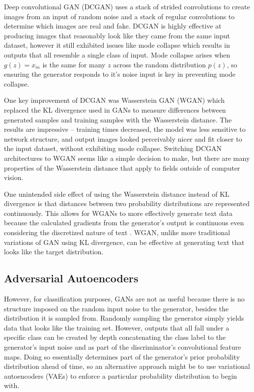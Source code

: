 \documentclass{article}
\begin{document}
		Deep convolutional GAN (DCGAN) \parencite{Radford2015} uses a stack of strided
		convolutions to create images from an input of random noise and a stack of
		regular convolutions to determine which images are real and fake. DCGAN is highly
		effective at producing images that reasonably look like they came from the same
		input dataset, however it still exhibited issues like mode collapse which results
		in outputs that all resemble a single class of input. Mode collapse arises when
		$g(z)=x_m$ is the same for many $z$ across the random distribution $p(z)$, so
		ensuring the generator responds to it's noise input is key in preventing mode collapse.

		One key improvement of DCGAN was Wasserstein GAN (WGAN) \parencite{Arjovsky2017}
		which replaced the KL divergence used in GANs to measure differences between generated
		samples and training samples with the Wasserstein distance. The results are impressive --
		training times decreased, the model was less sensitive to network structure, and output
		images looked perceivably nicer and fit closer to the input dataset, without exhibiting mode collapse.
		Switching DCGAN architectures to WGAN seems like a simple decision to make, but there
		are many properties of the Wasserstein distance that apply to fields outside of
		computer vision.

		One unintended side effect of using the Wasserstein distance instead of KL divergence is that distances
		between two probability distributions are represented continuously. This allows
		for WGANs to more effectively generate text data because the calculated gradients
		from the generator's output is continuous even considering the discretized nature of text
		\parencite{GoodfellowReddit2016}. WGAN, unlike more traditional variations of GAN using
		KL divergence, can be effective at generating text that looks like the target distribution.

	\subsection{Adversarial Autoencoders}
		However, for classification purposes, GANs are not as useful because there is no
		structure imposed on the random input noise to the generator, besides the distribution
		it is sampled from. Randomly sampling the generator simply yields data that looks like
		the training set. However, outputs that all	fall under a specific class can be created
		by depth concatenating the class label to the generator's input noise and as part of
		the discriminator's convolutional feature maps. Doing so essentially determines
		part of the generator's prior probability distribution ahead of time, so an alternative
		approach might be to use variational autoencoders (VAEs) to enforce a particular
		probability distribution to begin with.
\end{document}
